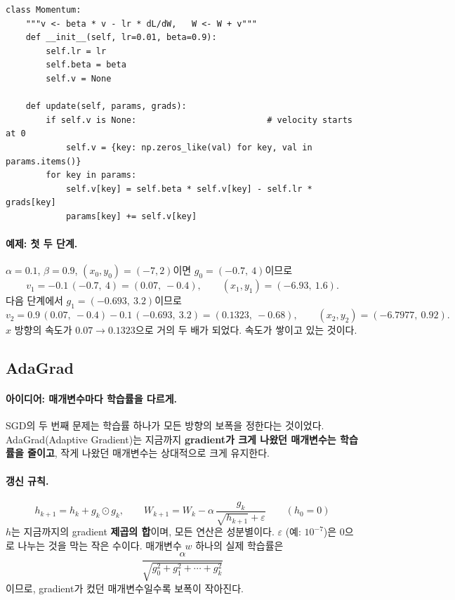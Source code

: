 \documentclass[11pt,a4paper]{article}
\begin{document}
\begin{lstlisting}
class Momentum:
    """v <- beta * v - lr * dL/dW,   W <- W + v"""
    def __init__(self, lr=0.01, beta=0.9):
        self.lr = lr
        self.beta = beta
        self.v = None

    def update(self, params, grads):
        if self.v is None:                          # velocity starts at 0
            self.v = {key: np.zeros_like(val) for key, val in params.items()}
        for key in params:
            self.v[key] = self.beta * self.v[key] - self.lr * grads[key]
            params[key] += self.v[key]
\end{lstlisting}

\paragraph{예제: 첫 두 단계.}
$\alpha=0.1$, $\beta=0.9$, $(x_0,y_0)=(-7,2)$이면 $g_0=(-0.7,\ 4)$이므로
\[
v_1=-0.1\,(-0.7,\ 4)=(0.07,\ -0.4),
\qquad
(x_1,y_1)=(-6.93,\ 1.6).
\]
다음 단계에서 $g_1=(-0.693,\ 3.2)$이므로
\[
v_2=0.9\,(0.07,\ -0.4)-0.1\,(-0.693,\ 3.2)=(0.1323,\ -0.68),
\qquad
(x_2,y_2)=(-6.7977,\ 0.92).
\]
$x$ 방향의 속도가 $0.07\to0.1323$으로 거의 두 배가 되었다. 속도가 쌓이고 있는 것이다.

\subsection{AdaGrad}\label{sec:adagrad}

\paragraph{아이디어: 매개변수마다 학습률을 다르게.}
SGD의 두 번째 문제는 학습률 하나가 모든 방향의 보폭을 정한다는 것이었다.
AdaGrad(Adaptive Gradient)는 지금까지 \textbf{gradient가 크게 나왔던 매개변수는 학습률을 줄이고},
작게 나왔던 매개변수는 상대적으로 크게 유지한다.

\paragraph{갱신 규칙.}
\[
\boxed{
h_{k+1}=h_k+g_k\odot g_k,
\qquad
W_{k+1}=W_k-\alpha\,\frac{g_k}{\sqrt{h_{k+1}}+\varepsilon}
}
\qquad(h_0=0)
\]
$h$는 지금까지의 gradient \textbf{제곱의 합}이며, 모든 연산은 성분별이다.
$\varepsilon$ (예: $10^{-7}$)은 $0$으로 나누는 것을 막는 작은 수이다.
매개변수 $w$ 하나의 실제 학습률은
\[
\frac{\alpha}{\sqrt{g_0^2+g_1^2+\cdots+g_k^2}}
\]
이므로, gradient가 컸던 매개변수일수록 보폭이 작아진다.
\end{document}
